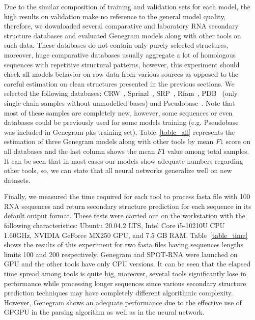 Due to the similar composition of training and validation sets for each model, the high results on validation make no reference to the general model quality, therefore, we downloaded several comparative and laboratory RNA secondary structure databases and evaluated Genegram models along with other tools on such data. These databases do not contain only purely selected structures, moreover, huge comparative databases usually aggregate a lot of homologous sequences with repetitive structural patterns, however, this experiment should check all models behavior on row data from various sources as opposed to the careful estimation on clean structures presented in the previous sections. We selected the following databases: CRW~\cite{cannone2002comparative}, Sprinzl~\cite{sprinzl1998compilation}, SRP~\cite{zwieb1992signal}, Rfam~\cite{griffiths2003rfam}, PDB~\cite{berman2000protein} (only single-chain samples without unmodelled bases) and Pseudobase~\cite{van2000pseudobase}. Note that most of these samples are completely new, however, some sequences or even databases could be previously used for some models training (e.g. Pseudobase was included in Genegram-pks training set). Table~\ref{table_all} represents the estimation of three Genegram models along with other tools by mean $F1$ score on all databases and the last column shows the mean $F1$ value among total samples. It can be seen that in most cases our models show adequate numbers regarding other tools, so, we can state that all neural networks generalize well on new datasets.



Finally, we measured the time required for each tool to process fasta file with 100 RNA sequences and return secondary structure prediction for each sequence in its default output format. These tests were carried out on the workstation with the following characteristics: Ubuntu 20.04.2 LTS, Intel Core i5-10210U CPU 1.60GHz, NVIDIA GeForce MX250 GPU, and 7.5 GB RAM. Table~\ref{table_time} shows the results of this experiment for two fasta files having sequences lengths limits 100 and 200 respectively. Genegram and SPOT-RNA were launched on GPU and the other tools have only CPU versions. It can be seen that the elapsed time spread among tools is quite big, moreover, several tools significantly lose in performance while processing longer sequences since various secondary structure prediction techniques may have completely different algorithmic complexity. However, Genegram shows an adequate performance due to the effective use of GPGPU in the parsing algorithm as well as in the neural network.

